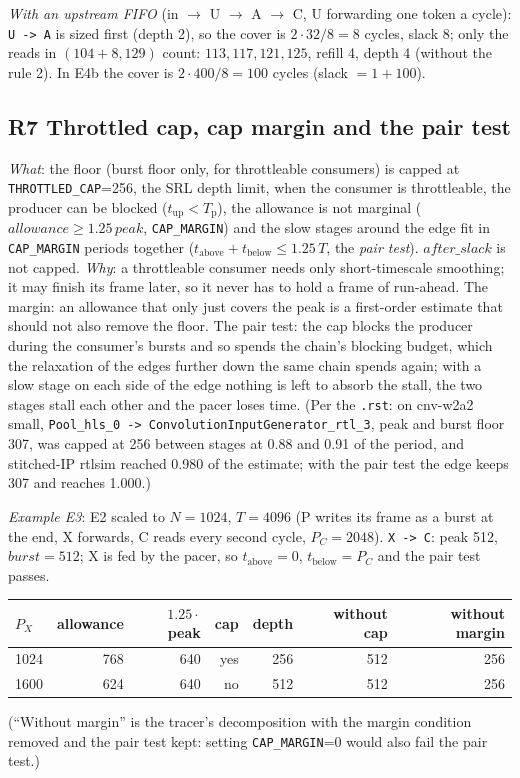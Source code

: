 \documentclass[10pt,a4paper]{article}
\newcommand{\code}[1]{\texttt{#1}}
\newcommand{\Tg}{T}           %
\newcommand{\Tp}{T_{\mathrm{p}}} %
\newcommand{\NF}{N}            %
\begin{document}
\emph{With an upstream FIFO} (in $\to$ U $\to$ A $\to$ C, U forwarding one token a
cycle): \code{U -> A} is sized first (depth 2), so the cover is $2\cdot32/8=8$
cycles, slack 8; only the reads in $(104+8,129)$ count: $113,117,121,125$, refill 4,
depth 4 (without the rule 2). In E4b the cover is $2\cdot400/8=100$ cycles
(slack $=1+100$).

\subsection{R7 Throttled cap, cap margin and the pair test}

\emph{What}: the floor (burst floor only, for throttleable consumers) is capped at
\code{THROTTLED\_CAP}=256, the SRL depth limit, when the consumer is throttleable,
the producer can be blocked ($t_{\mathrm{up}}<\Tp$), the allowance is not
marginal ($\mathit{allowance}\ge1.25\,\mathit{peak}$, \code{CAP\_MARGIN}) and the
slow stages around the edge fit in \code{CAP\_MARGIN} periods together
($t_{\mathrm{above}}+t_{\mathrm{below}}\le1.25\,\Tg$, the \emph{pair test}).
$\mathit{after\_slack}$ is not capped. \emph{Why}: a throttleable consumer needs
only short-timescale smoothing; it may finish its frame later, so it never has to
hold a frame of run-ahead. The margin: an allowance that only just covers the peak is a
first-order estimate that should not also remove the floor. The pair test: the cap
blocks the producer during the consumer's bursts and so spends the chain's blocking
budget, which the relaxation of the edges further down the same chain spends again;
with a slow stage on each side of the edge nothing is left to absorb the stall, the
two stages stall each other and the pacer loses time. (Per the \code{.rst}: on cnv-w2a2
small, \code{Pool\_hls\_0 -> ConvolutionInputGenerator\_rtl\_3}, peak and burst floor
307, was capped at 256 between stages at 0.88 and 0.91 of the period, and stitched-IP
rtlsim reached 0.980 of the estimate; with the pair test the edge keeps 307 and
reaches 1.000.)

\emph{Example E3}: E2 scaled to $\NF=1024$, $\Tg=4096$ (P writes its frame as a
burst at the end, X forwards, C reads every second cycle, $P_C=2048$).
\code{X -> C}: peak 512, $\mathit{burst}=512$; X is fed by the pacer, so
$t_{\mathrm{above}}=0$, $t_{\mathrm{below}}=P_C$ and the pair test passes.
\begin{center}\small
\begin{tabular}{@{}lrrrrrr@{}}
\toprule
$P_X$ & allowance & $1.25\cdot$peak & cap & depth & without cap & without margin\\
\midrule
1024 & 768 & 640 & yes & 256 & 512 & 256\\
1600 & 624 & 640 & no  & 512 & 512 & 256\\
\bottomrule
\end{tabular}
\end{center}
(``Without margin'' is the tracer's decomposition with the margin condition removed and
the pair test kept: setting \code{CAP\_MARGIN}=0 would also fail the pair test.)
\end{document}
